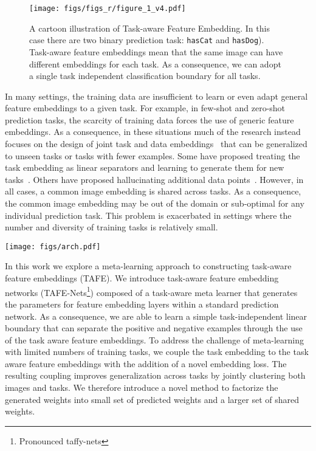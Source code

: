 \documentclass[10pt,twocolumn,letterpaper]{article}
\newcommand{\model}{TAFE-Net\xspace}
\newcommand{\modelplural}{TAFE-Nets\xspace}
\begin{document}
\begin{figure}[t]
    \centering
    \texttt{[image: figs/figs\_r/figure\_1\_v4.pdf]} \caption{A cartoon illustration of Task-aware Feature Embedding. In this case there are two binary prediction task: \texttt{hasCat} and \texttt{hasDog}).
    Task-aware feature embeddings mean that the same image can have different embeddings for each task.
    As a consequence, we can adopt a single task independent classification boundary for all tasks.}
    \label{fig:tafe}
\end{figure}

In many settings, the training data are insufficient to learn or even adapt general feature embeddings to a given task.
For example, in few-shot and zero-shot prediction tasks, the scarcity of training data forces the use of generic feature embeddings.
As a consequence, in these situations much of the research instead focuses on the design of joint task and data embeddings~\cite{Changpinyo_2016_CVPR,frome2013devise,zhang2016zero} that can be generalized to unseen tasks or tasks with fewer examples. 
Some have proposed treating the task embedding as linear separators and learning to generate them for new tasks~\cite{vinyals2016matching,lu2016visual}. 
Others have proposed hallucinating additional data points~\cite{xian2018feature,hariharan2017low, wang2018low}. 
However, in all cases, a common image embedding is shared across tasks. 
As a consequence, the common image embedding may be out of the domain or sub-optimal for any individual prediction task. 
This problem is exacerbated in settings where the number and diversity of training tasks is relatively small.

\begin{figure*}[ht]
    \centering
    \texttt{[image: figs/arch.pdf]}
    \caption{\model architecture design. \model has
    a task-aware meta learner that generates the parameters of
    the feature layers within a prediction network for classification. The generated weights are
    factorized into task-specific weights in low dimension and 
    shared weights across all tasks.}
    \label{fig:model_arch}
\end{figure*}

In this work we explore a meta-learning approach to constructing task-aware feature embeddings (TAFE).  
We introduce task-aware feature embedding networks
(\modelplural\footnote{Pronounced taffy-nets}) composed of a task-aware meta learner that generates the parameters for feature embedding layers within a standard prediction network.
As a consequence, we are able to learn a simple task-independent linear boundary that can separate the positive and negative examples through the use of the task aware feature embeddings. 
To address the challenge of meta-learning with limited numbers of training tasks, we couple the task embedding to the task aware feature embeddings with the addition of a novel embedding loss.
The resulting coupling improves generalization across tasks by jointly clustering both images and tasks.
We therefore introduce a novel method to factorize the generated
weights into small set of predicted weights and a larger set of shared weights.
\end{document}
